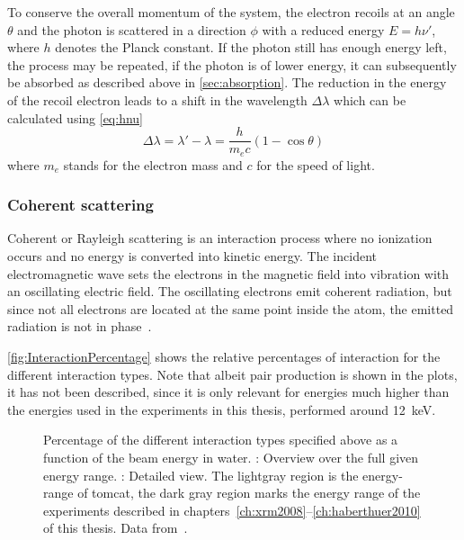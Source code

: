 To conserve the overall momentum of the system, the electron recoils at an angle $\theta$ and the photon is scattered in a direction $\phi$ with a reduced energy $E=h\nu'$, where $h$ denotes the Planck constant. If the photon still has enough energy left, the process may be repeated, if the photon is of lower energy, it can subsequently be absorbed as described above in \autoref{sec:absorption}. The reduction in the energy of the recoil electron leads to a shift in the wavelength $\Delta\lambda$ which can be calculated using \autoref{eq:hnu}
\begin{equation}
	\Delta\lambda = \lambda' - \lambda = \frac{h}{m_e c}(1-\cos{\theta})
	\label{eq:hnu}
\end{equation}
where $m_e$ stands for the electron mass and $c$ for the speed of light.

\subsubsection{Coherent scattering}
Coherent or Rayleigh scattering is an interaction process where no ionization occurs and no energy is converted into kinetic energy. The incident electromagnetic wave sets the electrons in the magnetic field into vibration with an oscillating electric field. The oscillating electrons emit coherent radiation, but since not all electrons are located at the same point inside the atom, the emitted radiation is not in phase~\cite{Hsieh2003,Stampanoni2002}.

\autoref{fig:InteractionPercentage} shows the relative percentages of interaction for the different interaction types. Note that albeit pair production is shown in the plots, it has not been described, since it is only relevant for energies much higher than the energies used in the experiments in this thesis, performed around \SI{12}{\kilo\electronvolt}. 

\def\width{0.5\linewidth}%
\def\height{0.309\linewidth}%
\begin{figure}[htb]%
	\noindent{}%
	\caption[Interaction types]{Percentage of the different interaction types specified above as a function of the beam energy in water. : Overview over the full given energy range. : Detailed view. The lightgray region is the energy-range of \ac{tomcat}, the dark gray region marks the energy range of the experiments described in chapters~\ref{ch:xrm2008}--\ref{ch:haberthuer2010} of this thesis. Data from~\citet[Table 5-5]{Johns1983}.}%
	\label{fig:InteractionPercentage}%
\end{figure}%

